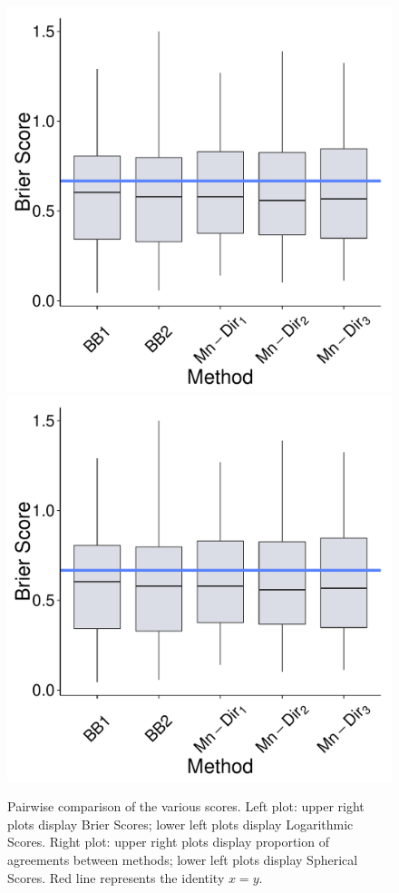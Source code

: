 \documentclass[journal,article,accept,moreauthors,pdftex,12pt,a4paper]{mdpi}
\begin{document}
	
		\begin{figure}[H]
			\centering
			\includegraphics[page=13,scale=0.48]{futebolComparacaoModelosForPaper.pdf}
			\includegraphics[page=14,scale=0.48]{futebolComparacaoModelosForPaper.pdf}\\
			\caption{Pairwise comparison of the various scores. Left plot: upper right plots display Brier Scores;
			lower left plots display Logarithmic Scores. Right plot: upper right plots display proportion of agreements
			between methods; lower left  plots display Spherical Scores. Red line represents the identity $x=y$.}
			\label{fig::scores2}
		\end{figure}
		
\end{document}
